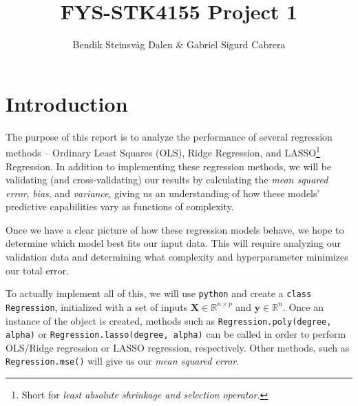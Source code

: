 \documentclass[a4paper,10pt,english]{article}
\begin{document}
\title{FYS-STK4155 Project 1}
\author{Bendik Steinsvåg Dalen \& Gabriel Sigurd Cabrera}




\section*{Introduction}
\label{sec:introduction}

The purpose of this report is to analyze the performance of several regression methods – Ordinary Least Squares (OLS), Ridge Regression, and LASSO\footnote{Short for \textit{least absolute shrinkage and selection operator}.} Regression.  In addition to implementing these regression methods, we will be validating (and cross-validating) our results by calculating the \textit{mean squared error}, \textit{bias}, and \textit{variance}, giving us an understanding of how these models' predictive capabilities vary as functions of complexity.

Once we have a clear picture of how these regression models behave, we hope to determine which model best fits our input data.  This will require analyzing our validation data and determining what complexity and hyperparameter minimizes our total error.

To actually implement all of this, we will use \texttt{python} and create a \texttt{class Regression}, initialized with a set of inputs $\mathbf{X} \in \mathbb{R}^{n \times p}$ and $\mathbf{y} \in \mathbb{R}^n$.  Once an instance of the object is created, methods such as \texttt{Regression.poly(degree, alpha)} or \texttt{Regression.lasso(degree, alpha)} can be called in order to perform OLS/Ridge regression or LASSO regression, respectively.  Other methods, such as \texttt{Regression.mse()} will give us our \textit{mean squared error}.
\end{document}
